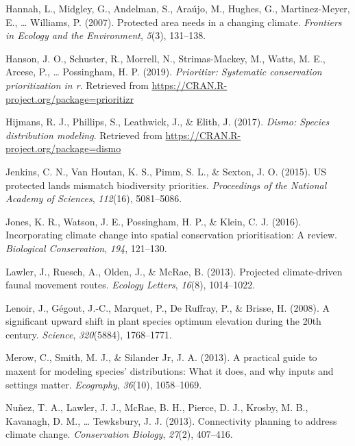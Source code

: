 \documentclass[]{article}
\begin{document}
\leavevmode\hypertarget{ref-hannah2007protected}{}%
Hannah, L., Midgley, G., Andelman, S., Araújo, M., Hughes, G., Martinez-Meyer, E., \ldots{} Williams, P. (2007). Protected area needs in a changing climate. \emph{Frontiers in Ecology and the Environment}, \emph{5}(3), 131--138.

\leavevmode\hypertarget{ref-Hanson2019}{}%
Hanson, J. O., Schuster, R., Morrell, N., Strimas-Mackey, M., Watts, M. E., Arcese, P., \ldots{} Possingham, H. P. (2019). \emph{Prioritizr: Systematic conservation prioritization in r}. Retrieved from \url{https://CRAN.R-project.org/package=prioritizr}

\leavevmode\hypertarget{ref-Hijmans_Dismo}{}%
Hijmans, R. J., Phillips, S., Leathwick, J., \& Elith, J. (2017). \emph{Dismo: Species distribution modeling}. Retrieved from \url{https://CRAN.R-project.org/package=dismo}

\leavevmode\hypertarget{ref-jenkins2015us}{}%
Jenkins, C. N., Van Houtan, K. S., Pimm, S. L., \& Sexton, J. O. (2015). US protected lands mismatch biodiversity priorities. \emph{Proceedings of the National Academy of Sciences}, \emph{112}(16), 5081--5086.

\leavevmode\hypertarget{ref-jones2016incorporating}{}%
Jones, K. R., Watson, J. E., Possingham, H. P., \& Klein, C. J. (2016). Incorporating climate change into spatial conservation prioritisation: A review. \emph{Biological Conservation}, \emph{194}, 121--130.

\leavevmode\hypertarget{ref-lawler2013projected}{}%
Lawler, J., Ruesch, A., Olden, J., \& McRae, B. (2013). Projected climate-driven faunal movement routes. \emph{Ecology Letters}, \emph{16}(8), 1014--1022.

\leavevmode\hypertarget{ref-lenoir2008significant}{}%
Lenoir, J., Gégout, J.-C., Marquet, P., De Ruffray, P., \& Brisse, H. (2008). A significant upward shift in plant species optimum elevation during the 20th century. \emph{Science}, \emph{320}(5884), 1768--1771.

\leavevmode\hypertarget{ref-merow2013practical}{}%
Merow, C., Smith, M. J., \& Silander Jr, J. A. (2013). A practical guide to maxent for modeling species' distributions: What it does, and why inputs and settings matter. \emph{Ecography}, \emph{36}(10), 1058--1069.

\leavevmode\hypertarget{ref-nunez2013connectivity}{}%
Nuñez, T. A., Lawler, J. J., McRae, B. H., Pierce, D. J., Krosby, M. B., Kavanagh, D. M., \ldots{} Tewksbury, J. J. (2013). Connectivity planning to address climate change. \emph{Conservation Biology}, \emph{27}(2), 407--416.
\end{document}
